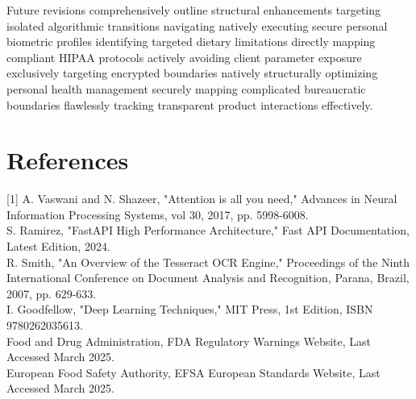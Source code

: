 \documentclass[12pt,a4paper]{report}
\begin{document}
Future revisions comprehensively outline structural enhancements targeting isolated algorithmic transitions navigating natively executing secure personal biometric profiles identifying targeted dietary limitations directly mapping compliant HIPAA protocols actively avoiding client parameter exposure exclusively targeting encrypted boundaries natively structurally optimizing personal health management securely mapping complicated bureaucratic boundaries flawlessly tracking transparent product interactions effectively.

\chapter*{References}
[1] A. Vaswani and N. Shazeer, "Attention is all you need," Advances in Neural Information Processing Systems, vol 30, 2017, pp. 5998-6008.\\
\relax[2] S. Ramirez, "FastAPI High Performance Architecture," Fast API Documentation, Latest Edition, 2024.\\
\relax[3] R. Smith, "An Overview of the Tesseract OCR Engine," Proceedings of the Ninth International Conference on Document Analysis and Recognition, Parana, Brazil, 2007, pp. 629-633.\\
\relax[4] I. Goodfellow, "Deep Learning Techniques," MIT Press, 1st Edition, ISBN 9780262035613.\\
\relax[5] Food and Drug Administration, FDA Regulatory Warnings Website, Last Accessed March 2025.\\ 
\relax[6] European Food Safety Authority, EFSA European Standards Website, Last Accessed March 2025.
\end{document}
